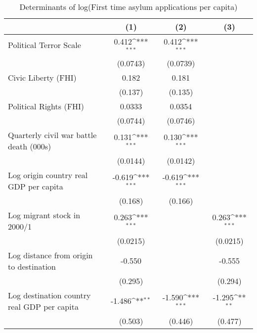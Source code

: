 \begin{table}[htbp]\centering
\def\sym#1{\ifmmode^{#1}\else\(^{#1}\)\fi}
\caption{Determinants of log(First time asylum applications per capita)}
\begin{tabular}{l*{3}{c}}
\hline\hline
                    &\multicolumn{1}{c}{(1)}         &\multicolumn{1}{c}{(2)}         &\multicolumn{1}{c}{(3)}         \\
\hline
Political Terror Scale&       0.412\sym{***}&       0.412\sym{***}&                     \\
                    &    (0.0743)         &    (0.0739)         &                     \\
[1em]
Civic Liberty (FHI) &       0.182         &       0.181         &                     \\
                    &     (0.137)         &     (0.135)         &                     \\
[1em]
Political Rights (FHI)&      0.0333         &      0.0354         &                     \\
                    &    (0.0744)         &    (0.0746)         &                     \\
[1em]
Quarterly civil war battle death (000s)&       0.131\sym{***}&       0.130\sym{***}&                     \\
                    &    (0.0144)         &    (0.0142)         &                     \\
[1em]
Log origin country real GDP per capita&      -0.619\sym{***}&      -0.619\sym{***}&                     \\
                    &     (0.168)         &     (0.166)         &                     \\
[1em]
Log migrant stock in 2000/1&       0.263\sym{***}&                     &       0.263\sym{***}\\
                    &    (0.0215)         &                     &    (0.0215)         \\
[1em]
Log distance from origin to destination&      -0.550         &                     &      -0.555         \\
                    &     (0.295)         &                     &     (0.294)         \\
[1em]
Log destination country real GDP per capita&      -1.486\sym{**} &      -1.590\sym{***}&      -1.295\sym{**} \\
                    &     (0.503)         &     (0.446)         &     (0.477)         \\

\end{tabular}
\end{table}
